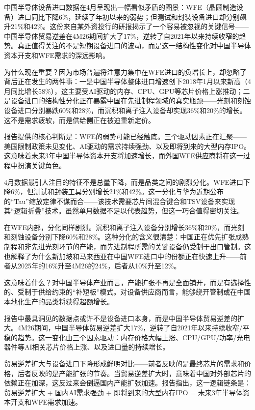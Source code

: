 \documentclass[11pt]{ctexart}
\begin{document}
中国半导体设备进口数据在4月呈现出一幅看似矛盾的图景：WFE（晶圆制造设备）进口同比下降6\%，延续了年初以来的弱势；但测试和封装设备进口却分别飙升21\%和42\%。这份来自某外资投行的研报揭示了一个容易被忽视的关键信号——中国半导体贸易逆差在4M26期间扩大了17\%，逆转了自2021年以来持续收窄的趋势。真正值得关注的不是短期设备进口的波动，而是这一结构性变化对中国半导体资本开支和WFE需求的深远影响。

为什么现在重要？因为市场普遍将注意力集中在WFE进口的负增长上，却忽略了背后正在发生的两件事：一是中国半导体整体进口增速创下2018年1月以来新高（4月同比增长58\%），这主要受AI驱动的内存、CPU、GPU等芯片价格上涨推动；二是设备进口的结构性分化正在暴露中国在先进制程领域的真实瓶颈——光刻和刻蚀设备进口分别暴跌60\%和28\%，而沉积和离子注入设备却实现36\%和20\%的增长。这不是需求疲软，而是供给侧正在被迫重新定价。

报告提供的核心判断是：WFE的弱势可能已经触底。三个驱动因素正在汇聚——美国限制政策未见变化、AI驱动的需求持续强劲、以及即将到来的大型内存IPO。这意味着未来3年中国半导体资本开支将加速增长，而外国WFE供应商将在这一过程中扮演关键角色。

4月数据最引人注目的特征不是总量下降，而是品类之间的剧烈分化。WFE进口下降6\%，但测试和封装工具分别增长21\%和42\%。这一分化与华为近期公布的“Tau”缩放定律不谋而合——该技术需要芯片间混合键合和TSV设备来实现其“逻辑折叠”技术。虽然单月数据不足以代表趋势，但这一巧合值得密切关注。

在WFE内部，分化同样剧烈。沉积和离子注入设备分别增长36\%和20\%，而光刻和刻蚀设备分别下降60\%和28\%。这种分化的含义很清楚：中国正在优先扩张成熟制程和非先进光刻环节的产能，而先进制程所需的关键设备仍受制于出口管制。这也解释了为什么新加坡和马来西亚在中国WFE进口中的份额正在快速上升——前者从2025年的16\%升至4M26的24\%，后者从10\%升至12\%。

这意味着什么？对中国半导体产业而言，产能扩张不再是全面铺开，而是有选择性的、受制于供给约束的“补短板”模式。对设备供应商而言，能够绕开管制或在中国本地化生产的品类将获得超额增长。

报告中最具洞见的数据点或许不是设备进口本身，而是中国半导体贸易逆差的扩大。4M26期间，中国半导体贸易逆差扩大17\%，逆转了自2021年以来持续收窄/平稳的趋势。这一变化由三个因素驱动：内存价格大幅上涨、CPU/GPU/功率/光电器件等AI相关芯片价格上涨、以及进口量的持续增长。

贸易逆差扩大与设备进口下降形成鲜明对比——前者反映的是最终芯片的需求和价格，后者反映的是产能扩张的节奏。当贸易逆差扩大时，意味着中国对外部芯片的依赖正在加深，这反过来会倒逼国内产能扩张加速。报告指出，这一逻辑链条是：贸易逆差扩大 + 国内AI需求强劲 + 即将到来的大型内存IPO = 未来3年半导体资本开支和WFE需求加速。
\end{document}
